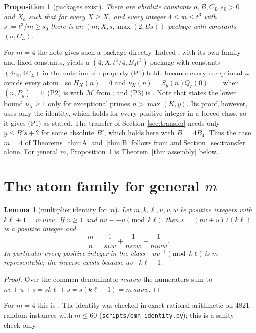 \documentclass[10pt,reqno]{amsart}
\newtheorem{lemma}[theorem]{Lemma}
\newtheorem{proposition}[theorem]{Proposition}
\theoremstyle{definition}
\newcommand{\M}{\mathcal M}
\begin{document}
\begin{proposition}[packages exist]\label{prop:package}
There are absolute constants $a,B,C_L,s_0>0$ and $X_a$ such that for
every $X\geq X_a$ and every integer $4\leq m\leq t^3$ with
$s:=t^3/m\geq s_0$ there is an $(m;X,s,\max(2,Bs))$-package with
constants $(a,C_L)$.
\end{proposition}

For $m=4$ the note gives such a package directly.  Indeed
\cite[Theorem~8.2]{TQ}, with its own family and fixed constants, yields a
$(4;X,t^3/4,B_4t^3)$-package with constants $(4c_a,4C_L)$ in the notation
of \cite{TQ}: property (P1) holds because every
exceptional $n$ avoids every atom \cite[Lemma~2.2]{TQ}, so $H_X(n)=0$ and
$\nu_X(n)=S_y(n)Q_r(0)=1$ when $(n,P_y)=1$; (P2) is \cite[(44)]{TQ} with
$\M$ from \cite[(7)]{TQ}; and (P3) is \cite[(43)]{TQ}.  Note that
\cite[Theorem~8.2]{TQ} states the lower bound $\nu_X\geq1$ only for
exceptional primes $n>\max(K,y)$.  Its proof, however, uses only the
identity, which holds for every positive integer in a forced class, so
it gives (P1) as stated.  The transfer of Section~\ref{sec:transfer}
needs only $y\leq B's+2$ for some absolute $B'$, which holds here with
$B'=4B_4$.  Thus the case $m=4$ of Theorems~\ref{thm:A} and~\ref{thm:B}
follows from \cite{TQ} and Section~\ref{sec:transfer} alone.  For general $m$,
Proposition~\ref{prop:package} is Theorem~\ref{thm:assembly} below.

\section{\texorpdfstring{The atom family for general $m$}{The atom family for general m}}\label{sec:atoms}
\begin{lemma}[multiplier identity for $m$]\label{lem:identity}
Let $m,k,\ell,u,v,w$ be positive integers with $k\ell+1=m\,uvw$.  If
$n\geq1$ and $nv\equiv-u\pmod{k\ell}$, then $s=(nv+u)/(k\ell)$ is a
positive integer and
\[
 \frac mn=\frac1{suw}+\frac1{nsvw}+\frac1{nuvw}.
\]
In particular every positive integer in the class $-uv^{-1}\pmod{k\ell}$
is $m$-representable; the inverse exists because $uv\mid k\ell+1$.
\end{lemma}

\begin{proof}
Over the common denominator $nsuvw$ the numerators sum to
$nv+u+s=sk\ell+s=s(k\ell+1)=m\,suvw$.
\end{proof}

For $m=4$ this is \cite[Lemma~2.1]{TQ}.  The identity was checked in
exact rational arithmetic on $4821$ random instances with $m\leq60$
(\texttt{scripts/emn\_identity.py}); this is a sanity check only.
\end{document}
